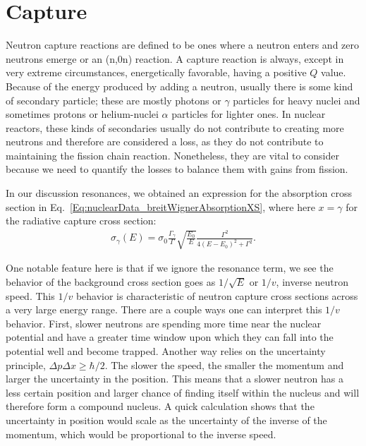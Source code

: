 \section{Capture}

Neutron capture reactions are defined to be ones where a neutron enters and zero neutrons emerge or an (n,0n) reaction. A capture reaction is always, except in very extreme circumstances, energetically favorable, having a positive $Q$ value. Because of the energy produced by adding a neutron, usually there is some kind of secondary particle; these are mostly photons or $\gamma$ particles for heavy nuclei and sometimes protons or helium-nuclei $\alpha$ particles for lighter ones. In nuclear reactors, these kinds of secondaries usually do not contribute to creating more neutrons and therefore are considered a loss, as they do not contribute to maintaining the fission chain reaction. Nonetheless, they are vital to consider because we need to quantify the losses to balance them with gains from fission.

In our discussion resonances, we obtained an expression for the absorption cross section in Eq.~\eqref{Eq:nuclearData_breitWignerAbsorptionXS}, where here $x = \gamma$ for the radiative capture cross section: 
\begin{align} \label{Eq:nuclearData_breitWignerCaptureXS}
  \sigma_\gamma(E) = \sigma_0 \frac{\Gamma_\gamma}{\Gamma}  \sqrt{ \frac{E_0}{E} } \frac{ \Gamma^2 }{ 4 ( E - E_0 )^2 + \Gamma^2 } .
\end{align}

One notable feature here is that if we ignore the resonance term, we see the behavior of the background cross section goes as $1/\sqrt{E}$ or $1/v$, inverse neutron speed. This $1/v$ behavior is characteristic of neutron capture cross sections across a very large energy range. There are a couple ways one can interpret this $1/v$ behavior. First, slower neutrons are spending more time near the nuclear potential and have a greater time window upon which they can fall into the potential well and become trapped. Another way relies on the uncertainty principle, $\Delta p \Delta x \ge \hbar / 2$. The slower the speed, the smaller the momentum and larger the uncertainty in the position. This means that a slower neutron has a less certain position and larger chance of finding itself within the nucleus and will therefore form a compound nucleus. A quick calculation shows that the uncertainty in position would scale as the uncertainty of the inverse of the momentum, which would be proportional to the inverse speed.

